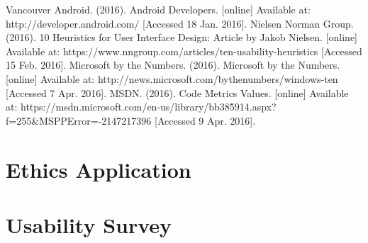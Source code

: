 \documentclass[12pt]{report}
\begin{document}
\begin{thebibliography}{15}
Vancouver
		 Android. (2016). Android Developers. [online] Available at: http://developer.android.com/ [Accessed 18 Jan. 2016].
		 Nielsen Norman Group. (2016). 10 Heuristics for User Interface Design: Article by Jakob Nielsen. [online] Available at: https://www.nngroup.com/articles/ten-usability-heuristics [Accessed 15 Feb. 2016].
		 Microsoft by the Numbers. (2016). Microsoft by the Numbers. [online] Available at: http://news.microsoft.com/bythenumbers/windows-ten [Accessed 7 Apr. 2016].
		 MSDN. (2016). Code Metrics Values. [online] Available at: https://msdn.microsoft.com/en-us/library/bb385914.aspx?f=255{\&}MSPPError=-2147217396 [Accessed 9 Apr. 2016].
	\end{thebibliography}
		
	\newpage
	
	\begin{appendix}
		\chapter{Ethics Application}{
			
			\label{app:Ethics}
		}
		\chapter{Usability Survey}{
			
			\label{app:Survey}
		}
	\end{appendix}
\end{document}
